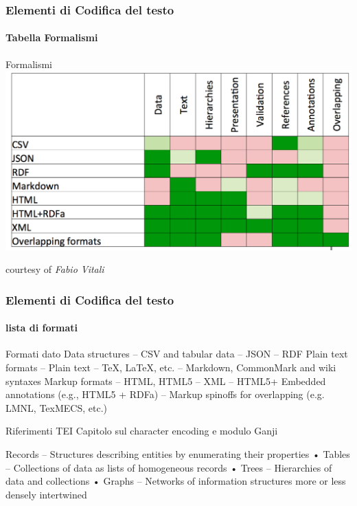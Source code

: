 
\begin{frame}
    \frametitle{Elementi di Codifica del testo}
    \framesubtitle{Tabella Formalismi}
    \addtocounter{nframe}{1}
    
    \begin{block}{Formalismi}
	    \includegraphics[width=.5\textwidth]{imgs/TabellaFormalismiCodificaTesto.png}
    \end{block}
    courtesy of \textit{Fabio Vitali}

\end{frame}


\begin{frame}
    \frametitle{Elementi di Codifica del testo}
    \framesubtitle{lista di formati}
    \addtocounter{nframe}{1}
    
    \begin{block}{Formati dato}
Data structures – CSV and tabular data
– JSON
– RDF
Plain text formats – Plain text
– TeX, LaTeX, etc.
– Markdown, CommonMark and wiki syntaxes
Markup formats
– HTML, HTML5
– XML
– HTML5+ Embedded annotations (e.g., HTML5 + RDFa)
– Markup spinoffs for overlapping (e.g. LMNL, TexMECS, etc.) 

    \end{block}

    \begin{block}{Riferimenti TEI}
        Capitolo sul character encoding e modulo Ganji 
    \end{block}

\end{frame}


Records
– Structures describing entities by enumerating their
properties
• Tables
– Collections of data as lists of homogeneous
records
• Trees
– Hierarchies of data and collections
• Graphs
– Networks of information structures more or less
densely intertwined 




